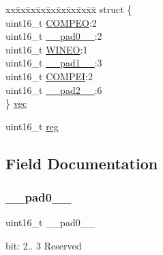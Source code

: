 \begin{DoxyCompactItemize}
\begin{tabbing}
\end{tabbing}\item 
\begin{tabbing}
xx\=xx\=xx\=xx\=xx\=xx\=xx\=xx\=xx\=\kill
struct \{\\
\>uint16\_t \mbox{\hyperlink{union_a_c___e_v_c_t_r_l___type_a032878f848babd2b840bb46397d415d0}{COMPEO}}:2\\
\>uint16\_t \mbox{\hyperlink{union_a_c___e_v_c_t_r_l___type_a77132c2c26a75f5b8751b235cda23828}{\_\_pad0\_\_}}:2\\
\>uint16\_t \mbox{\hyperlink{union_a_c___e_v_c_t_r_l___type_ab7360af94bcc95c927b21d5542264ecc}{WINEO}}:1\\
\>uint16\_t \mbox{\hyperlink{union_a_c___e_v_c_t_r_l___type_ab72e3a1f2f7db8695c60c658f5a0f11a}{\_\_pad1\_\_}}:3\\
\>uint16\_t \mbox{\hyperlink{union_a_c___e_v_c_t_r_l___type_af7d025d4c607d493fb0179526034486b}{COMPEI}}:2\\
\>uint16\_t \mbox{\hyperlink{union_a_c___e_v_c_t_r_l___type_a82701c5ec65a0fca9a84d8edc46a8192}{\_\_pad2\_\_}}:6\\
\} \mbox{\hyperlink{union_a_c___e_v_c_t_r_l___type_a76faa8995cb9073e470a55f5a50a4d25}{vec}}\\

\end{tabbing}\item 
uint16\+\_\+t \mbox{\hyperlink{union_a_c___e_v_c_t_r_l___type_a11760f5020019f4aa8cb02e694f7cc44}{reg}}
\end{DoxyCompactItemize}


\subsection{Field Documentation}
\mbox{\label{union_a_c___e_v_c_t_r_l___type_a77132c2c26a75f5b8751b235cda23828}} 
\subsubsection{\texorpdfstring{\_\_pad0\_\_}{\_\_pad0\_\_}}
{\footnotesize\ttfamily uint16\+\_\+t \+\_\+\+\_\+pad0\+\_\+\+\_\+}

bit\+: 2.. 3 Reserved \mbox{\label{union_a_c___e_v_c_t_r_l___type_ab72e3a1f2f7db8695c60c658f5a0f11a}} 
